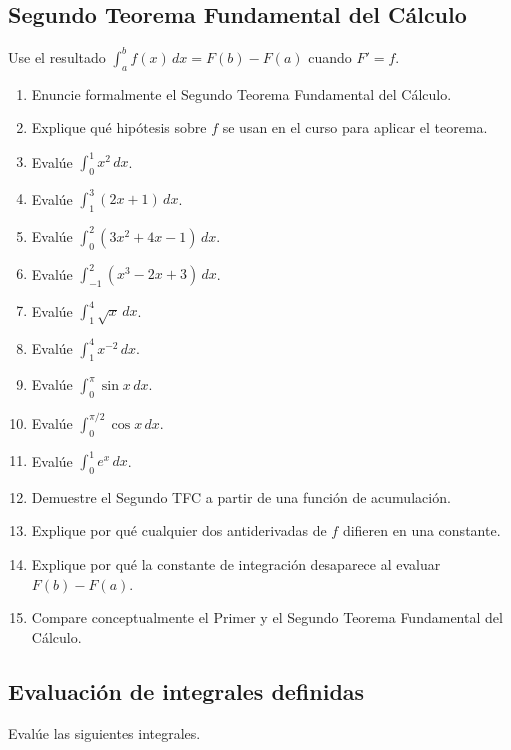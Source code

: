 \documentclass[12pt]{article}
\begin{document}
\subsection{Segundo Teorema Fundamental del Cálculo}
Use el resultado $\int_a^bf(x)\,dx=F(b)-F(a)$ cuando $F'=f$.

\begin{enumerate}[resume]
\item Enuncie formalmente el Segundo Teorema Fundamental del Cálculo.
\item Explique qué hipótesis sobre $f$ se usan en el curso para aplicar el teorema.
\item Evalúe $\int_0^1x^2\,dx$.
\item Evalúe $\int_1^3(2x+1)\,dx$.
\item Evalúe $\int_0^2(3x^2+4x-1)\,dx$.
\item Evalúe $\int_{-1}^{2}(x^3-2x+3)\,dx$.
\item Evalúe $\int_1^4\sqrt{x}\,dx$.
\item Evalúe $\int_1^4x^{-2}\,dx$.
\item Evalúe $\int_0^\pi\sin x\,dx$.
\item Evalúe $\int_0^{\pi/2}\cos x\,dx$.
\item Evalúe $\int_0^1e^x\,dx$.
\item Demuestre el Segundo TFC a partir de una función de acumulación.
\item Explique por qué cualquier dos antiderivadas de $f$ difieren en una constante.
\item Explique por qué la constante de integración desaparece al evaluar $F(b)-F(a)$.
\item Compare conceptualmente el Primer y el Segundo Teorema Fundamental del Cálculo.
\end{enumerate}
\subsection{Evaluación de integrales definidas}
Evalúe las siguientes integrales.
\end{document}
